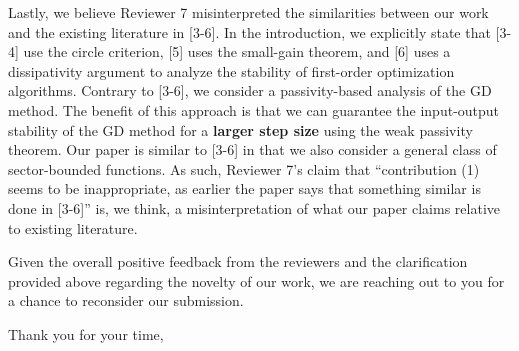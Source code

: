\begin{flushleft}
    Lastly, we believe Reviewer 7 misinterpreted the similarities between our work and the existing literature in [3-6]. In the introduction, we explicitly state that [3-4] use the circle criterion, [5] uses the small-gain theorem, and [6] uses a dissipativity argument to analyze the stability of first-order optimization algorithms. Contrary to [3-6], we consider a passivity-based analysis of the GD method. The benefit of this approach is that we can guarantee the input-output stability of the GD method for a \textbf{larger step size} using the weak passivity theorem. Our paper is similar to [3-6] in that we also consider a general class of sector-bounded functions. As such, Reviewer 7's claim that ``contribution (1) seems to be inappropriate, as earlier the paper says that something similar is done in [3-6]'' is, we think, a misinterpretation of what our paper claims relative to existing literature.

    Given the overall positive feedback from the reviewers and the clarification provided above regarding the novelty of our work, we are reaching out to you for a chance to reconsider our submission.

    Thank you for your time,\\%
    \theauthor
\end{flushleft}
\newpage